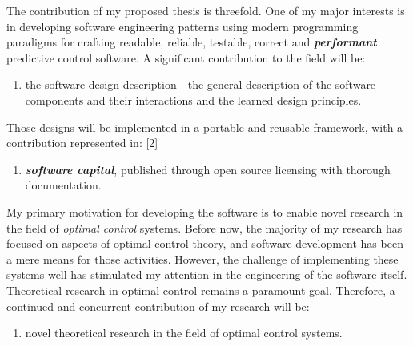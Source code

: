 The contribution of my proposed thesis is threefold. One of my major interests
is in developing software engineering patterns using modern programming
paradigms for crafting readable, reliable, testable, correct and
\emph{\textbf{performant}} predictive control software. A significant
contribution to the field will be:
%
\begin{enumerate}[label=(C\arabic*)]
  \item the software design description—the general description of the software
  components and their interactions and the learned design principles.
\end{enumerate}
%
Those designs will be implemented in a portable and reusable framework, with a
contribution represented in:
%
[2\baselineskip]
%
\begin{enumerate}[label=(C\arabic*), resume]
  \item \textit{\textbf{software capital}}, published through open source
  licensing with thorough documentation.
\end{enumerate}
%
My primary motivation for developing the software is to enable novel research in
the field of \emph{optimal control} systems. Before now, the majority of my
research has focused on aspects of optimal control theory, and software
development has been a mere means for those activities. However, the challenge
of implementing these systems well has stimulated my attention in the
engineering of the software itself. Theoretical research in optimal control
remains a paramount goal. Therefore, a continued and concurrent contribution of
my research will be:
%
\begin{enumerate}[label=(C\arabic*), resume]
  \item novel theoretical research in the field of optimal control systems.
\end{enumerate}

%

